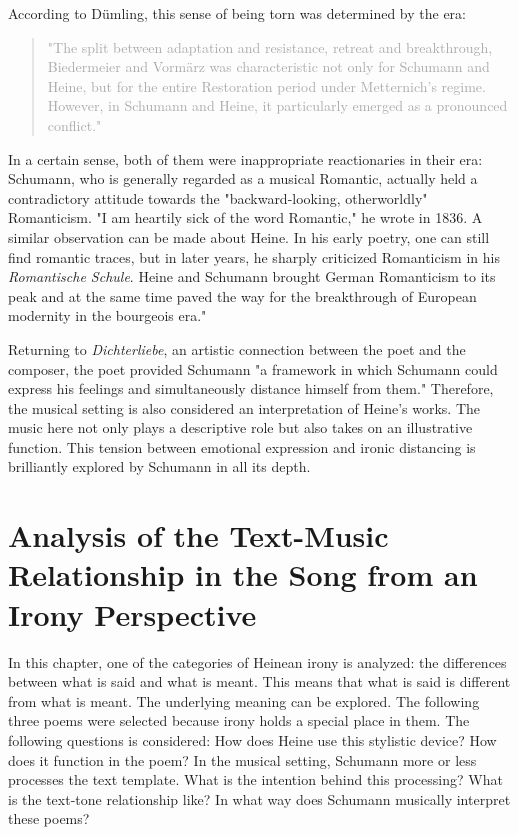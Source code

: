 \documentclass[10pt,a4paper,twocolumn]{rho}
\begin{document}
According to Dümling, this sense of being torn was determined by the era: 

\begin{quote}
\textcolor{darkgray}{"The split between adaptation and resistance, retreat and breakthrough, Biedermeier and Vormärz was characteristic not only for Schumann and Heine, but for the entire Restoration period under Metternich's regime. However, in Schumann and Heine, it particularly emerged as a pronounced conflict."}
\end{quote}

In a certain sense, both of them were inappropriate reactionaries in their era: Schumann, who is generally regarded as a musical Romantic, actually held a contradictory attitude towards the "backward-looking, otherworldly" Romanticism. "I am heartily sick of the word Romantic," he wrote in 1836. A similar observation can be made about Heine. In his early poetry, one can still find romantic traces, but in later years, he sharply criticized Romanticism in his \textit{Romantische Schule}. Heine and Schumann brought German Romanticism to its peak and at the same time paved the way for the breakthrough of European modernity in the bourgeois era."

Returning to \textit{Dichterliebe}, an artistic connection between the poet and the composer, the poet provided Schumann "a framework in which Schumann could express his feelings and simultaneously distance himself from them." Therefore, the musical setting is also considered an interpretation of Heine's works. The music here not only plays a descriptive role but also takes on an illustrative function. This tension between emotional expression and ironic distancing is brilliantly explored by Schumann in all its depth.

\section{Analysis of the Text-Music Relationship in the Song from an Irony Perspective}

In this chapter, one of the categories of Heinean irony is analyzed: the differences between what is said and what is meant. This means that what is said is different from what is meant. The underlying meaning can be explored. The following three poems were selected because irony holds a special place in them. The following questions is considered: How does Heine use this stylistic device? How does it function in the poem? In the musical setting, Schumann more or less processes the text template. What is the intention behind this processing? What is the text-tone relationship like? In what way does Schumann musically interpret these poems?
\end{document}
